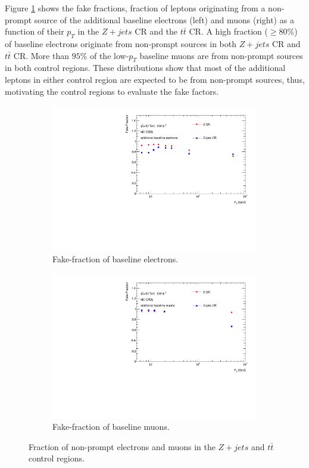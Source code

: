 Figure \ref{fig:FakeFractionBaseline} shows the fake fractions, fraction of leptons originating from a non-prompt source of the additional baseline electrons (left) and muons (right) as a function of their $p_{T}$ in the $Z+jets$ CR and the $t\bar{t}$ CR. A high fraction ($\geq 80\%$) of baseline electrons originate from non-prompt sources in both $Z+jets$ CR and $t\bar{t}$ CR. More than $95\%$ of the low-$p_{T}$ baseline muons are from non-prompt sources in both control regions. These distributions show that most of the additional leptons in either control region are expected to be from non-prompt sources, thus,  motivating the control regions to evaluate the fake factors.

\begin{figure}[htb]
    \begin{subfigure}{.48\textwidth}
        \centering
        \includegraphics[width=.9\linewidth]{figures/Analysis/Background/FakeFractionBaselineElectrons.pdf}
        \caption{Fake-fraction of baseline electrons.}
    \end{subfigure}
    \begin{subfigure}{.48\textwidth}
        \centering
        \includegraphics[width=.9\linewidth]{figures/Analysis/Background/FakeFractionBaselineMuons.pdf}
        \caption{Fake-fraction of baseline muons.}
    \end{subfigure}
        \caption{Fraction of non-prompt electrons and muons in the $Z+jets$ and $t\bar{t}$ control regions. \label{fig:FakeFractionBaseline}}
\end{figure}

